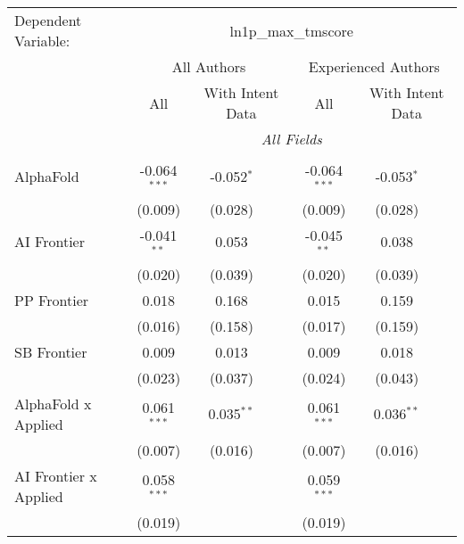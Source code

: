 \begingroup
\centering
\begin{tabular}{lcccccc}
   \tabularnewline \midrule \midrule
   Dependent Variable: & \multicolumn{6}{c}{ln1p\_max\_tmscore}\\
 & \multicolumn{3}{c}{All Authors} & \multicolumn{3}{c}{Experienced Authors} \\
\cmidrule(lr){2-4} \cmidrule(lr){5-7}
 & \multicolumn{1}{c}{All} & \multicolumn{2}{c}{With Intent Data} & \multicolumn{1}{c}{All} & \multicolumn{2}{c}{With Intent Data} \\
\cmidrule(lr){2-2} \cmidrule(lr){3-4} \cmidrule(lr){5-5} \cmidrule(lr){6-7}
 & \multicolumn{6}{c}{\textit{All Fields}} \\ \\
   AlphaFold                      & -0.064$^{***}$ & -0.052$^{*}$ &                & -0.064$^{***}$ & -0.053$^{*}$ &   \\   
                                  & (0.009)        & (0.028)      &                & (0.009)        & (0.028)      &   \\   
   AI Frontier                    & -0.041$^{**}$  & 0.053        &                & -0.045$^{**}$  & 0.038        &   \\   
                                  & (0.020)        & (0.039)      &                & (0.020)        & (0.039)      &   \\   
   PP Frontier                    & 0.018          & 0.168        &                & 0.015          & 0.159        &   \\   
                                  & (0.016)        & (0.158)      &                & (0.017)        & (0.159)      &   \\   
   SB Frontier                    & 0.009          & 0.013        &                & 0.009          & 0.018        &   \\   
                                  & (0.023)        & (0.037)      &                & (0.024)        & (0.043)      &   \\   
   AlphaFold x Applied            & 0.061$^{***}$  & 0.035$^{**}$ &                & 0.061$^{***}$  & 0.036$^{**}$ &   \\   
                                  & (0.007)        & (0.016)      &                & (0.007)        & (0.016)      &   \\   
   AI Frontier x Applied          & 0.058$^{***}$  &              &                & 0.059$^{***}$  &              &   \\   
                                  & (0.019)        &              &                & (0.019)        &              &   \\   

\end{tabular}
